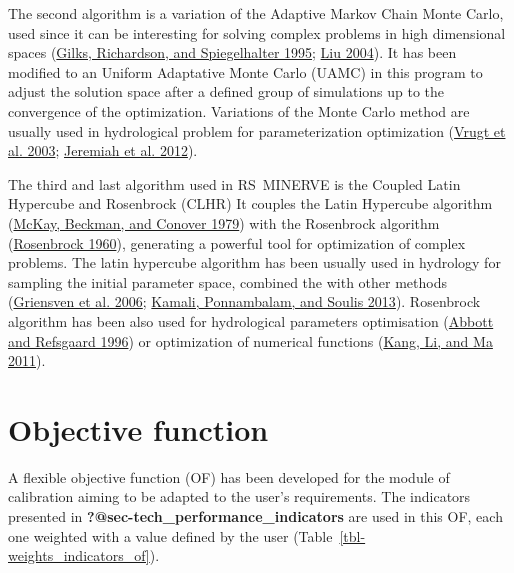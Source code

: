 \documentclass[
  letterpaper,
  DIV=11,
  numbers=noendperiod]{scrreprt}
\begin{document}
The second algorithm is a variation of the Adaptive Markov Chain Monte
Carlo, used since it can be interesting for solving complex problems in
high dimensional spaces
(\protect\hyperlink{ref-gilks_markov_1995}{Gilks, Richardson, and
Spiegelhalter 1995}; \protect\hyperlink{ref-liu_monte_2004}{Liu 2004}).
It has been modified to an Uniform Adaptative Monte Carlo (UAMC) in this
program to adjust the solution space after a defined group of
simulations up to the convergence of the optimization. Variations of the
Monte Carlo method are usually used in hydrological problem for
parameterization optimization
(\protect\hyperlink{ref-vrugt_effective_2003}{Vrugt et al. 2003};
\protect\hyperlink{ref-jeremiah_efficient_2012}{Jeremiah et al. 2012}).

The third and last algorithm used in RS~MINERVE is the Coupled Latin
Hypercube and Rosenbrock (CLHR) It couples the Latin Hypercube algorithm
(\protect\hyperlink{ref-mckay_comparison_1979}{McKay, Beckman, and
Conover 1979}) with the Rosenbrock algorithm
(\protect\hyperlink{ref-rosenbrock_automatic_1960}{Rosenbrock 1960}),
generating a powerful tool for optimization of complex problems. The
latin hypercube algorithm has been usually used in hydrology for
sampling the initial parameter space, combined the with other methods
(\protect\hyperlink{ref-van_griensven_global_2006}{Griensven et al.
2006}; \protect\hyperlink{ref-kamali_comparison_2013}{Kamali,
Ponnambalam, and Soulis 2013}). Rosenbrock algorithm has been also used
for hydrological parameters optimisation
(\protect\hyperlink{ref-abbott_distributed_1996}{Abbott and Refsgaard
1996}) or optimization of numerical functions
(\protect\hyperlink{ref-kang_rosenbrock_2011}{Kang, Li, and Ma 2011}).

\hypertarget{sec-tech_calibration_algorithms_of}{%
\chapter{Objective function}\label{sec-tech_calibration_algorithms_of}}

A flexible objective function (OF) has been developed for the module of
calibration aiming to be adapted to the user's requirements. The
indicators presented in \textbf{?@sec-tech\_performance\_indicators} are
used in this OF, each one weighted with a value defined by the user
(Table~\ref{tbl-weights_indicators_of}).
\end{document}
